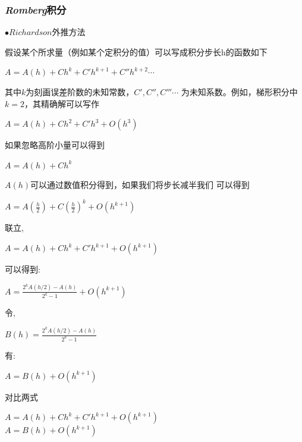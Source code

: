 \documentclass[11pt, a4paper, oneside]{ctexart}
\begin{document}
{{{{    
    }


\subsubsection{\emph{Romberg}积分}
{
    {
    $\bullet Richardson$外推方法
    \par  假设某个所求量（例如某个定积分的值）可以写成积分步长h的函数如下
    \begin{center}
        $A=A(h)+ Ch^k + C'h^{k+1}+C''h^{k+2}\cdots$
    \end{center} 
    

    其中$k$为刻画误差阶数的未知常数，$C',C'',C'''\cdots$
    为未知系数。例如，梯形积分中$k=2$，其精确解可以写作
    \begin{center}
        $A=A(h)+ Ch^2 + C'h^3+O(h^{3})$
    \end{center} 
    
    
    如果忽略高阶小量可以得到
    \begin{center}
        $A=A(h)+ Ch^k $
    \end{center} 


    $A(h)$可以通过数值积分得到，如果我们将步长减半我们
    可以得到
    \begin{center}
        $A=A(\frac h2)+ C{(\frac h 2)}^k +O(h^{k+1})$
    \end{center} 


    联立,
    \begin{center}
        $A=A(h)+ Ch^k + C'h^{k+1}+O(h^{k+1})$
    \end{center} 

    可以得到:

    \begin{center}
        $A=\frac{2^kA(h/2)-A(h)}{2^k-1}+O(h^{k+1})$
    \end{center} 


    令,
    \begin{center}
        \large $B(h)=\frac{2^kA(h/2)-A(h)}{2^k-1}$
    \end{center} 

    有:
    \begin{center}
        $A=B(h)+O(h^{k+1})$
    \end{center} 

    对比两式

    \begin{center}
        $A=A(h)+ Ch^k + C'h^{k+1}+O(h^{k+1})$\\
        $A=B(h)+O(h^{k+1})$
    \end{center} 

}}}}}
\end{document}
